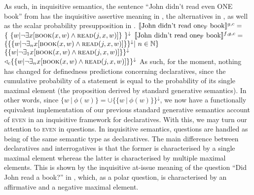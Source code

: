 \ex
{}
\xe
\ex 
{}
\xe
As such, in inquisitive semantics, the sentence \enquote{John didn't read even \MakeUppercase{one} book} from  has the inquisitive assertive meaning in , the alternatives in , as well as the scalar probability presupposition in .
\pex
\a $\intension[g,c]{John didn't read one\textsubscript{F} book}=$\\\emptyfill$\{~\{w|\neg\exists{x}[\predicate{book}(x,w)\land\predicate{read}(j,x,w)]\}~\}^\downarrow$
\a $\intension[f,g,c]{John didn't read one\textsubscript{F} book}=$\\\emptyfill$\{\{\{w|\neg\exists_n{x}[\predicate{book}(x,w)\land\predicate{read}(j,x,w)]\}\}^\downarrow|~n\in\mathbb{N}\}$
\xe
\ex
{}\\
$\{\{w|\neg\exists_1{x}[\predicate{book}(x,w)\land\predicate{read}(j,x,w)]\}\}^\downarrow$\\\emptyfill$\lprob_c\{\{w|\neg\exists_n{x}[\predicate{book}(x,w)\land\predicate{read}(j,x,w)]\}\}^\downarrow$
\xe
As such, for the moment, nothing has changed for definedness predictions concerning declaratives, since the cumulative probability of a statement is equal to the probability of its single maximal element (the proposition derived by standard generative semantics). In other words, since $\{w~|~\phi(w)\}=\cup\{\{w~|~\phi(w)\}\}^\downarrow$, we now have a functionally equivalent implementation of our previous standard generative semantics account of {\scshape even} in an inquisitive framework for declaratives. With this, we may turn our attention to {\scshape even} in questions. In inquisitive semantics, questions are handled as being of the same semantic type as declaratives. The main difference between declaratives and interrogatives is that the former is characterised by a single maximal element whereas the latter is characterised by multiple maximal elements. This is shown by the inquisitive at-issue meaning of the question \enquote{Did John read a book?} in , which, as a polar question, is characterised by an affirmative and a negative maximal element.
